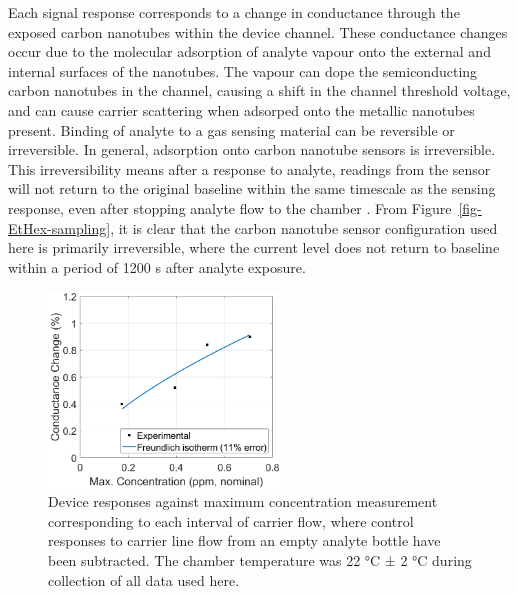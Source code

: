 \documentclass[
  a4paper,
]{scrbook}
\begin{document}
Each signal response corresponds to a change in conductance through the
exposed carbon nanotubes within the device channel. These conductance
changes occur due to the molecular adsorption of analyte vapour onto the
external and internal surfaces of the nanotubes. The vapour can dope the
semiconducting carbon nanotubes in the channel, causing a shift in the
channel threshold voltage, and can cause carrier scattering when
adsorped onto the metallic nanotubes present. Binding of analyte to a
gas sensing material can be reversible or irreversible. In general,
adsorption onto carbon nanotube sensors is irreversible. This
irreversibility means after a response to analyte, readings from the
sensor will not return to the original baseline within the same
timescale as the sensing response, even after stopping analyte flow to
the chamber \autocite{Agnihotri2005,Lee2005}. From
Figure~\ref{fig-EtHex-sampling}, it is clear that the carbon nanotube
sensor configuration used here is primarily irreversible, where the
current level does not return to baseline within a period of 1200 s
after analyte exposure.

\begin{figure}

{\centering \includegraphics[width=0.55\textwidth,height=\textheight]{figures/ch9/EtHex-ratio-comparison.png}

}

\caption[Device responses against maximum concentration measurement
corresponding to each interval of carrier flow, where control responses
to carrier line flow from an empty analyte bottle have been
subtracted.]{\label{fig-EtHex-ratio-comparison}Device responses against
maximum concentration measurement corresponding to each interval of
carrier flow, where control responses to carrier line flow from an empty
analyte bottle have been subtracted. The chamber temperature was 22 °C ±
2 °C during collection of all data used here.}

\end{figure}
\end{document}
